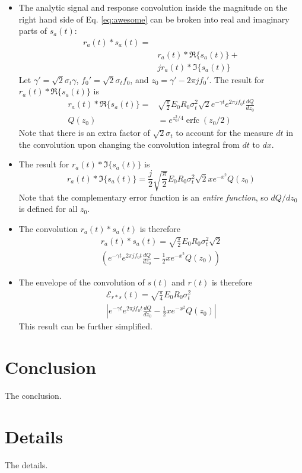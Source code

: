 \documentclass[amsmath,amssymb,aps,prd,10pt,twocolumn,showkeys]{revtex4}
\DeclareMathOperator\erfc{erfc}
\begin{document}
\begin{itemize}
\item The analytic signal and response convolution inside the magnitude on the right hand side of Eq. \ref{eq:awesome} can be broken into real and imaginary parts of $s_a(t)$:
\begin{align}
r_a (t) * s_a(t) = & \\ 
& r_a(t) * \Re\lbrace s_a(t)\rbrace + \\ 
& j r_a(t) * \Im\lbrace s_a(t)\rbrace
\end{align}
Let $\gamma' = \sqrt{2}\sigma_t \gamma$, $f_0' = \sqrt{2} \sigma_t f_0$, and $z_0 = \gamma' - 2\pi j f_0'$.  The result for $r_a(t) * \Re\lbrace s_a(t)\rbrace$ is
\begin{align}
r_a(t) * \Re\lbrace s_a(t)\rbrace =& \sqrt{\frac{\pi}{2}} E_0 R_0 \sigma_t^2 \sqrt{2} e^{-\gamma t} e^{2\pi j f_0 t} \frac{dQ}{dz_0} \\
Q(z_0) &= e^{z_0^2/4} \erfc(z_0/2)
\end{align}
Note that there is an extra factor of $\sqrt{2}\sigma_t$ to account for the measure $dt$ in the convolution upon changing the convolution integral from $dt$ to $dx$.
\item The result for $r_a(t) * \Im\lbrace s_a(t)\rbrace$ is
\begin{equation}
r_a(t) * \Im\lbrace s_a(t)\rbrace = \frac{j}{2}\sqrt{\frac{\pi}{2}} E_0 R_0 \sigma_t^2 \sqrt{2} x e^{-x^2} Q(z_0)
\end{equation}
Note that the complementary error function is an \textit{entire function}, so $dQ/dz_0$ is defined for all $z_0$.
\item The convolution $r_a (t) * s_a(t)$ is therefore
\begin{multline}
r_a (t) * s_a(t) = \sqrt{\frac{\pi}{2}} E_0 R_0 \sigma_t^2 \sqrt{2} \\ \left(e^{-\gamma t} e^{2\pi j f_0 t} \frac{dQ}{dz_0} - \frac{1}{2} x e^{-x^2} Q(z_0) \right)
\end{multline}
\item The envelope of the convolution of $s(t)$ and $r(t)$ is therefore
\begin{multline}
\mathcal{E}_{r * s}(t) = \sqrt{\frac{\pi}{4}} E_0 R_0 \sigma_t^2 \\ \left|e^{-\gamma t} e^{2\pi j f_0 t} \frac{dQ}{dz_0} - \frac{1}{2} x e^{-x^2} Q(z_0) \right|
\end{multline}
This result can be further simplified.
\end{itemize}

\section{Conclusion}
\label{sec:conc}

The conclusion.

\appendix

\section{Details}
\label{app:a}

The details.


\end{document}

